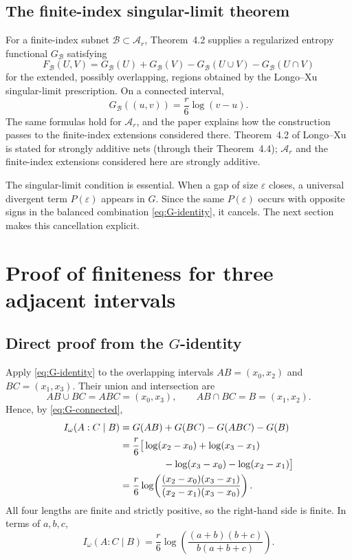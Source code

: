 \documentclass[11pt]{article}
\theoremstyle{accenttheorem}
\theoremstyle{definition}
\newcommand{\cB}{\mathcal{B}}
\newcommand{\Ar}{\mathcal{A}_{r}}
\newcommand{\MI}{F}
\newcommand{\CMI}{I_{\omega}}
\newcommand{\eps}{\varepsilon}
\newcommand{\1}{\mathbf{1}}
\begin{document}
\subsection{The finite-index singular-limit theorem}

For a finite-index subnet \(\cB\subset\Ar\), Theorem~4.2 supplies a regularized entropy functional \(G_{\cB}\) satisfying
\begin{equation}\label{eq:G-identity}
 \MI_{\cB}(U,V)
 =G_{\cB}(U)+G_{\cB}(V)-G_{\cB}(U\cup V)-G_{\cB}(U\cap V)
\end{equation}
for the extended, possibly overlapping, regions obtained by the Longo--Xu singular-limit prescription.  On a connected interval,
\begin{equation}\label{eq:G-connected}
 G_{\cB}((u,v))=\frac{r}{6}\log(v-u).
\end{equation}
The same formulas hold for \(\Ar\), and the paper explains how the construction passes to the finite-index extensions considered there.  Theorem~4.2 of Longo--Xu is stated for strongly additive nets (through their Theorem~4.4); \(\Ar\) and the finite-index extensions considered here are strongly additive.

The singular-limit condition is essential.  When a gap of size \(\eps\) closes, a universal divergent term \(P(\eps)\) appears in \(G\).  Since the same \(P(\eps)\) occurs with opposite signs in the balanced combination \eqref{eq:G-identity}, it cancels.  The next section makes this cancellation explicit.

\section{Proof of finiteness for three adjacent intervals}

\subsection{Direct proof from the \texorpdfstring{$G$}{G}-identity}

Apply \eqref{eq:G-identity} to the overlapping intervals \(AB=(x_0,x_2)\) and \(BC=(x_1,x_3)\).  Their union and intersection are
\[
 AB\cup BC=ABC=(x_0,x_3),\qquad AB\cap BC=B=(x_1,x_2).
\]
Hence, by \eqref{eq:G-connected},
\begin{align*}
 \CMI(A:C\mid B)
 &=G(AB)+G(BC)-G(ABC)-G(B)\\
 &=\frac{r}{6}\big[
      \log(x_2-x_0)+\log(x_3-x_1)\\
 &\hspace{4.5em}-\log(x_3-x_0)-\log(x_2-x_1)
    \big]\\
 &=\frac{r}{6}\log\!\left(
      \frac{(x_2-x_0)(x_3-x_1)}
           {(x_2-x_1)(x_3-x_0)}
    \right).
\end{align*}
All four lengths are finite and strictly positive, so the right-hand side is finite.  In terms of \(a,b,c\),
\begin{equation}\label{eq:abc-formula}
 \CMI(A:C\mid B)
 =\frac{r}{6}\log\!\left(
     \frac{(a+b)(b+c)}{b(a+b+c)}
   \right).
\end{equation}
\end{document}
